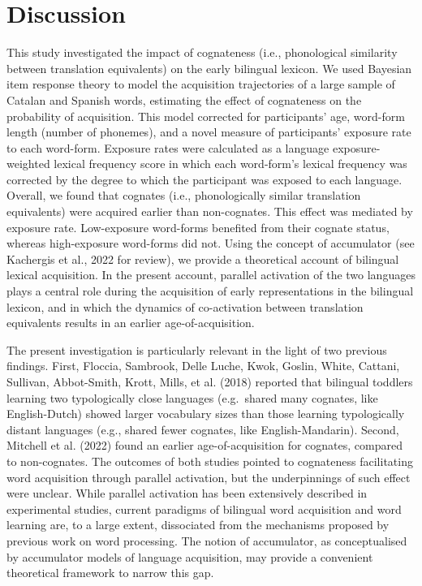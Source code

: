 \documentclass[
  12pt,
  b5paperpaper,
  twoside]{scrreprt}
\begin{document}
\hypertarget{sec-discussion}{%
\section{Discussion}\label{sec-discussion}}

This study investigated the impact of cognateness (i.e., phonological
similarity between translation equivalents) on the early bilingual
lexicon. We used Bayesian item response theory to model the acquisition
trajectories of a large sample of Catalan and Spanish words, estimating
the effect of cognateness on the probability of acquisition. This model
corrected for participants' age, word-form length (number of phonemes),
and a novel measure of participants' exposure rate to each word-form.
Exposure rates were calculated as a language exposure-weighted lexical
frequency score in which each word-form's lexical frequency was
corrected by the degree to which the participant was exposed to each
language. Overall, we found that cognates (i.e., phonologically similar
translation equivalents) were acquired earlier than non-cognates. This
effect was mediated by exposure rate. Low-exposure word-forms benefited
from their cognate status, whereas high-exposure word-forms did not.
Using the concept of accumulator (see Kachergis et al., 2022 for
review), we provide a theoretical account of bilingual lexical
acquisition. In the present account, parallel activation of the two
languages plays a central role during the acquisition of early
representations in the bilingual lexicon, and in which the dynamics of
co-activation between translation equivalents results in an earlier
age-of-acquisition.

The present investigation is particularly relevant in the light of two
previous findings. First, Floccia, Sambrook, Delle Luche, Kwok, Goslin,
White, Cattani, Sullivan, Abbot-Smith, Krott, Mills, et al. (2018)
reported that bilingual toddlers learning two typologically close
languages (e.g.~shared many cognates, like English-Dutch) showed larger
vocabulary sizes than those learning typologically distant languages
(e.g., shared fewer cognates, like English-Mandarin). Second, Mitchell
et al. (2022) found an earlier age-of-acquisition for cognates, compared
to non-cognates. The outcomes of both studies pointed to cognateness
facilitating word acquisition through parallel activation, but the
underpinnings of such effect were unclear. While parallel activation has
been extensively described in experimental studies, current paradigms of
bilingual word acquisition and word learning are, to a large extent,
dissociated from the mechanisms proposed by previous work on word
processing. The notion of accumulator, as conceptualised by accumulator
models of language acquisition, may provide a convenient theoretical
framework to narrow this gap.
\end{document}

